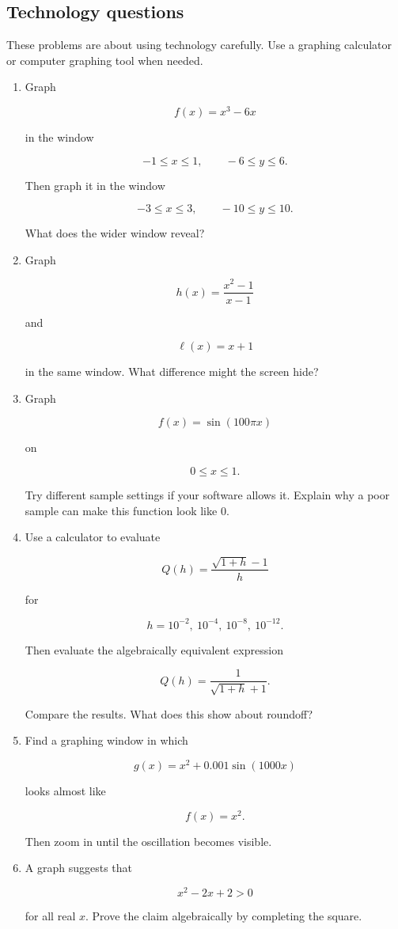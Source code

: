 \subsection{Technology questions}
\label{subsec:technology-questions}

These problems are about using technology carefully. Use a graphing calculator or computer graphing tool when needed.

\begin{enumerate}
\item Graph

\[
f(x)=x^3-6x
\]

in the window

\[
-1\le x\le 1,\qquad -6\le y\le 6.
\]

Then graph it in the window

\[
-3\le x\le 3,\qquad -10\le y\le 10.
\]

What does the wider window reveal?

\item Graph

\[
h(x)=\frac{x^2-1}{x-1}
\]

and

\[
\ell(x)=x+1
\]

in the same window. What difference might the screen hide?

\item Graph

\[
f(x)=\sin(100\pi x)
\]

on

\[
0\le x\le 1.
\]

Try different sample settings if your software allows it. Explain why a poor sample can make this function look like \(0\).

\item Use a calculator to evaluate

\[
Q(h)=\frac{\sqrt{1+h}-1}{h}
\]

for

\[
h=10^{-2},\ 10^{-4},\ 10^{-8},\ 10^{-12}.
\]

Then evaluate the algebraically equivalent expression

\[
Q(h)=\frac{1}{\sqrt{1+h}+1}.
\]

Compare the results. What does this show about roundoff?

\item Find a graphing window in which

\[
g(x)=x^2+0.001\sin(1000x)
\]

looks almost like

\[
f(x)=x^2.
\]

Then zoom in until the oscillation becomes visible.

\item A graph suggests that

\[
x^2-2x+2>0
\]

for all real \(x\). Prove the claim algebraically by completing the square.
\end{enumerate}

